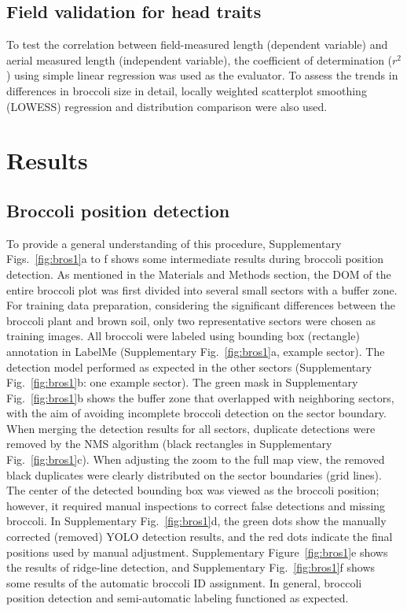 \subsection{Field validation for head traits}

To test the correlation between field-measured length (dependent variable) and aerial measured length (independent variable), the coefficient of determination ($r^2$) using simple linear regression was used as the evaluator. To assess the trends in differences in broccoli size in detail, locally weighted scatterplot smoothing (LOWESS) regression and distribution comparison were also used.

\section{Results}

\subsection{Broccoli position detection}

To provide a general understanding of this procedure, Supplementary Figs.~\ref{fig:bros1}a to f shows some intermediate results during broccoli position detection. As mentioned in the Materials and Methods section, the DOM of the entire broccoli plot was first divided into several small sectors with a buffer zone. For training data preparation, considering the significant differences between the broccoli plant and brown soil, only two representative sectors were chosen as training images. All broccoli were labeled using bounding box (rectangle) annotation in LabelMe (Supplementary Fig.~\ref{fig:bros1}a, example sector). The detection model performed as expected in the other sectors (Supplementary Fig.~\ref{fig:bros1}b: one example sector). The green mask in Supplementary Fig.~\ref{fig:bros1}b shows the buffer zone that overlapped with neighboring sectors, with the aim of avoiding incomplete broccoli detection on the sector boundary. When merging the detection results for all sectors, duplicate detections were removed by the NMS algorithm (black rectangles in Supplementary Fig.~\ref{fig:bros1}c). When adjusting the zoom to the full map view, the removed black duplicates were clearly distributed on the sector boundaries (grid lines). The center of the detected bounding box was viewed as the broccoli position; however, it required manual inspections to correct false detections and missing broccoli. In Supplementary Fig.~\ref{fig:bros1}d, the green dots show the manually corrected (removed) YOLO detection results, and the red dots indicate the final positions used by manual adjustment. Supplementary Figure~\ref{fig:bros1}e shows the results of ridge-line detection, and Supplementary Fig.~\ref{fig:bros1}f shows some results of the automatic broccoli ID assignment. In general, broccoli position detection and semi-automatic labeling functioned as expected.

